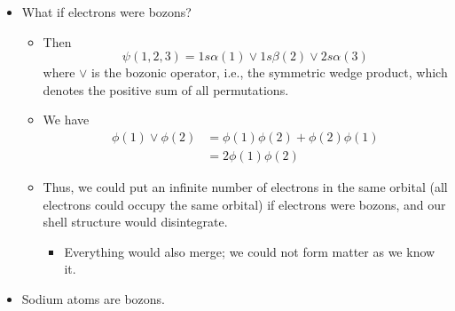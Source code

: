 \documentclass[../notes.tex]{subfiles}
\begin{document}
\begin{itemize}
    \item What if electrons were bozons?
    \begin{itemize}
        \item Then
        \begin{equation*}
            \psi(1,2,3) = 1s\alpha(1)\vee 1s\beta(2)\vee 2s\alpha(3)
        \end{equation*}
        where $\vee$ is the bozonic operator, i.e., the symmetric wedge product, which denotes the positive sum of all permutations.
        \item We have
        \begin{align*}
            \phi(1)\vee\phi(2) &= \phi(1)\phi(2)+\phi(2)\phi(1)\\
            &= 2\phi(1)\phi(2)
        \end{align*}
        \item Thus, we could put an infinite number of electrons in the same orbital (all electrons could occupy the same orbital) if electrons were bozons, and our shell structure would disintegrate.
        \begin{itemize}
            \item Everything would also merge; we could not form matter as we know it.
        \end{itemize}
    \end{itemize}
    \item Sodium atoms are bozons.
\end{itemize}
\end{document}
